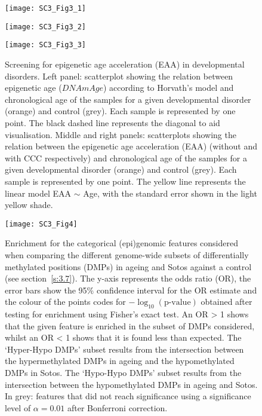 \begin{figure}[htbp!]
	\centering    
	\texttt{[image: SC3\_Fig3\_1]}
\end{figure}
\begin{figure}[htbp!]
	\centering    
	\texttt{[image: SC3\_Fig3\_2]}
\end{figure}
\begin{figure}[htbp!]
	\centering
	\texttt{[image: SC3\_Fig3\_3]}
	\caption[Screening for epigenetic age acceleration (EAA) in developmental disorders: additional scatterplots]{Screening for epigenetic age acceleration (EAA) in developmental disorders. Left panel: scatterplot showing the relation between epigenetic age ($DNAmAge$) according to Horvath’s model and chronological age of the samples for a given developmental disorder (orange) and control (grey). Each sample is represented by one point. The black dashed line represents the diagonal to aid visualisation. Middle and right panels: scatterplots showing the relation between the epigenetic age acceleration (EAA) (without and with CCC respectively) and chronological age of the samples for a given developmental disorder (orange) and control (grey). Each sample is represented by one point. The yellow line represents the linear model EAA $\sim$ Age, with the standard error shown in the light yellow shade.}
	\label{fig:sc3_fig3}
\end{figure}

\begin{figure}[htbp!] 
	\centering    
	\texttt{[image: SC3\_Fig4]}
	\vspace*{2 mm}
	\caption[Enrichment for the categorical (epi)genomic features in Sotos and ageing: genome-wide]{Enrichment for the categorical (epi)genomic features considered when comparing the different genome-wide subsets of differentially methylated positions (DMPs) in ageing and Sotos against a control (see section~\ref{s:3.7}). The y-axis represents the odds ratio (OR), the error bars show the 95\% confidence interval for the OR estimate and the colour of the points codes for $-\log_{10}(\text{p-value})$ obtained after testing for enrichment using Fisher's exact test. An OR > 1 shows that the given feature is enriched in the subset of DMPs considered, whilst an OR < 1 shows that it is found less than expected. The `Hyper-Hypo DMPs' subset results from the intersection between the hypermethylated DMPs in ageing and the hypomethylated DMPs in Sotos. The `Hypo-Hypo DMPs' subset results from the intersection between the hypomethylated DMPs in ageing and Sotos. In grey: features that did not reach significance using a significance level of $\alpha = 0.01$ after Bonferroni correction.}
	\label{fig:sc3_fig4}
\end{figure}

